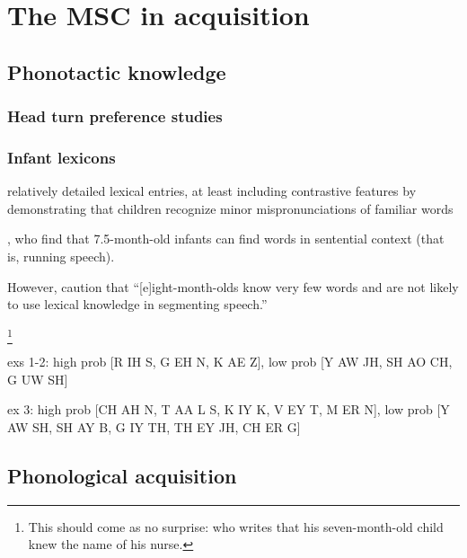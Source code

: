 \section{The MSC in acquisition}

\subsection{Phonotactic knowledge}

\subsubsection{Head turn preference studies}
\citet{Jusczyk1993b} %

\citet{Jusczyk2002}

\subsubsection{Infant lexicons}


\citet{Werker1984}

\citet{Swingley2000,Swingley2002}
relatively detailed lexical entries, at least including contrastive features
by demonstrating that children recognize minor mispronunciations of familiar words

\citet{Jusczyk1995}, who find that 7.5-month-old infants can find words in sentential context (that is, running speech).

However, \citet[][563]{Johnson2001} caution that ``[e]ight-month-olds know very few words and are not likely to use lexical knowledge in segmenting speech.''

\citet{Bergelson2010}

\footnote{This should come as no surprise: \citet[][294]{Darwin1877} who writes that his seven-month-old child knew the name of his nurse.}

\citet{Jusczyk1994}

exs 1-2:
high prob [R IH S, G EH N, K AE Z], low prob [Y AW JH, SH AO CH, G UW SH]

ex 3:
high prob [CH AH N, T AA L S, K IY K, V EY T, M ER N], low prob [Y AW SH, SH AY B, G IY TH, TH EY JH, CH ER G]

\citet{CDI,Dale1996}
\citet{Stadthagen-Gonzalez2006}
\citet{Cortese2008}
\citet{Bird2001b}

\subsection{Phonological acquisition}

